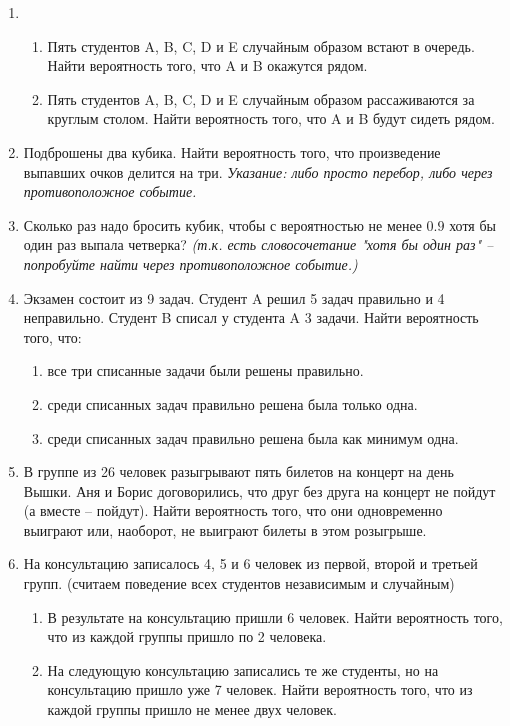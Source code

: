 \documentclass{article}
\begin{document}
\begin{enumerate}
    \item 
    \begin{enumerate}
        \item Пять студентов A, B, C, D и E случайным образом встают в очередь. Найти вероятность того, что A и B окажутся рядом.
        \item Пять студентов A, B, C, D и E случайным образом рассаживаются за круглым столом. Найти вероятность того, что A и B будут сидеть рядом.
    \end{enumerate}

    \item Подброшены два кубика. Найти вероятность того, что произведение выпавших очков делится на три.
    \textit{Указание: либо просто перебор, либо через противоположное событие.}

    \item Сколько раз надо бросить кубик, чтобы с вероятностью не менее $0.9$ хотя бы один раз выпала четверка? \textit{(т.к. есть словосочетание "хотя бы один раз" – попробуйте найти через противоположное событие.)}

    \item Экзамен состоит из 9 задач. Студент A решил 5 задач правильно и 4 неправильно. Студент B списал у студента A 3 задачи. Найти вероятность того, что:
    \begin{enumerate}
        \item все три списанные задачи были решены правильно.
        \item среди списанных задач правильно решена была только одна.
        \item среди списанных задач правильно решена была как минимум одна.
    \end{enumerate}

    \item В группе из 26 человек разыгрывают пять билетов на концерт на день Вышки. Аня и Борис договорились, что друг без друга на концерт не пойдут (а вместе -- пойдут). Найти вероятность того, что они одновременно выиграют или, наоборот, не выиграют билеты в этом розыгрыше.

    \item На консультацию записалось 4, 5 и 6 человек из первой, второй и третьей групп. (считаем поведение всех студентов независимым и случайным)
    \begin{enumerate}
        \item В результате на консультацию пришли 6 человек. Найти вероятность того, что из каждой группы пришло по 2 человека.
        \item На следующую консультацию записались те же студенты, но на консультацию пришло уже 7 человек. Найти вероятность того, что из каждой группы пришло не менее двух человек.
    \end{enumerate}


\end{enumerate}
\end{document}
